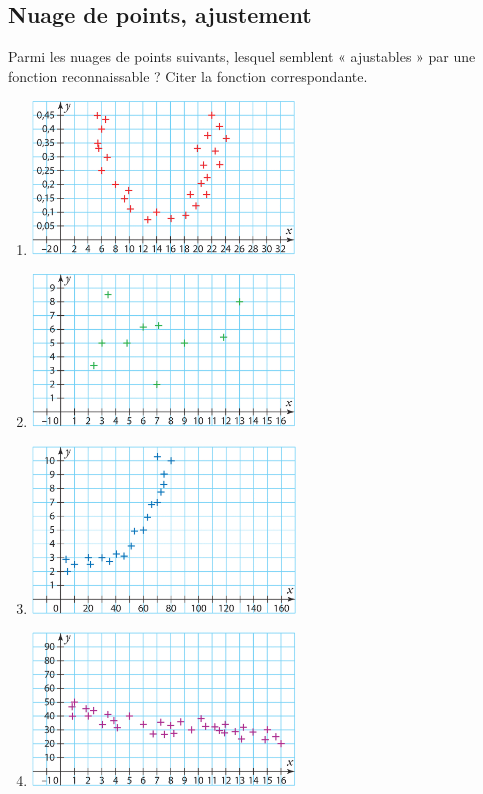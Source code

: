 \documentclass[a4paper,11pt,exos]{nsi} %
\begin{document}
\subsection*{Nuage de points, ajustement}
\exo{}
Parmi les nuages de points suivants, lesquel semblent « ajustables » par une fonction reconnaissable ? Citer la fonction correspondante.
\begin{multicols}{2}
    \begin{enumerate}
        \item \includegraphics[width=7cm]{Ex18aSesamath.png}
        \item \includegraphics[width=7cm]{Ex18bSesamath.png}
        \item \includegraphics[width=7cm]{Ex18cSesamath.png}
        \item \includegraphics[width=7cm]{Ex18dSesamath.png}
    \end{enumerate}
\end{multicols}
\end{document}
